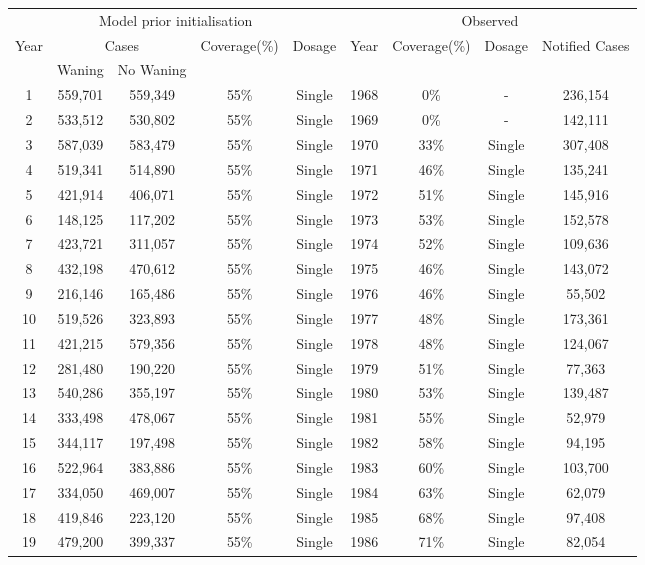 \documentclass[a4paper,11pt] {scrartcl}
\begin{document}
\begin{table}[hp]
\centering
\begin{tabular}{c c c c c | c c c c}
\toprule
\multicolumn{5}{c}{Model prior initialisation}&\multicolumn{4}{c}{Observed}\\
Year & \multicolumn{2}{c}{Cases} & Coverage(\%) & Dosage & Year & Coverage(\%) & Dosage & Notified Cases\\ 
& Waning & No Waning & & & & & & \\ 
\midrule
1 & 559,701 & 559,349 & 55\% & Single & 1968 & 0\% & - & 236,154\\ 
2 & 533,512 & 530,802 & 55\% & Single & 1969 & 0\% & - & 142,111\\ 
3 & 587,039 & 583,479 & 55\% & Single & 1970 & 33\% & Single & 307,408\\ 
4 & 519,341 & 514,890 & 55\% & Single & 1971 & 46\% & Single & 135,241\\ 
5 & 421,914 & 406,071 & 55\% & Single & 1972 & 51\% & Single & 145,916\\ 
6 & 148,125 & 117,202 & 55\% & Single & 1973 & 53\% & Single & 152,578\\ 
7 & 423,721 & 311,057 & 55\% & Single & 1974 & 52\% & Single & 109,636\\ 
8 & 432,198 & 470,612 & 55\% & Single & 1975 & 46\% & Single & 143,072\\ 
9 & 216,146 & 165,486 & 55\% & Single & 1976 & 46\% & Single & 55,502\\ 
10 & 519,526 & 323,893 & 55\% & Single & 1977 & 48\% & Single & 173,361\\ 
11 & 421,215 & 579,356 & 55\% & Single & 1978 & 48\% & Single & 124,067\\ 
12 & 281,480 & 190,220 & 55\% & Single & 1979 & 51\% & Single & 77,363\\ 
13 & 540,286 & 355,197 & 55\% & Single & 1980 & 53\% & Single & 139,487\\ 
14 & 333,498 & 478,067 & 55\% & Single & 1981 & 55\% & Single & 52,979\\ 
15 & 344,117 & 197,498 & 55\% & Single & 1982 & 58\% & Single & 94,195\\ 
16 & 522,964 & 383,886 & 55\% & Single & 1983 & 60\% & Single & 103,700\\ 
17 & 334,050 & 469,007 & 55\% & Single & 1984 & 63\% & Single & 62,079\\ 
18 & 419,846 & 223,120 & 55\% & Single & 1985 & 68\% & Single & 97,408\\ 
19 & 479,200 & 399,337 & 55\% & Single & 1986 & 71\% & Single & 82,054\\ 

\end{tabular}
\end{table}
\end{document}
